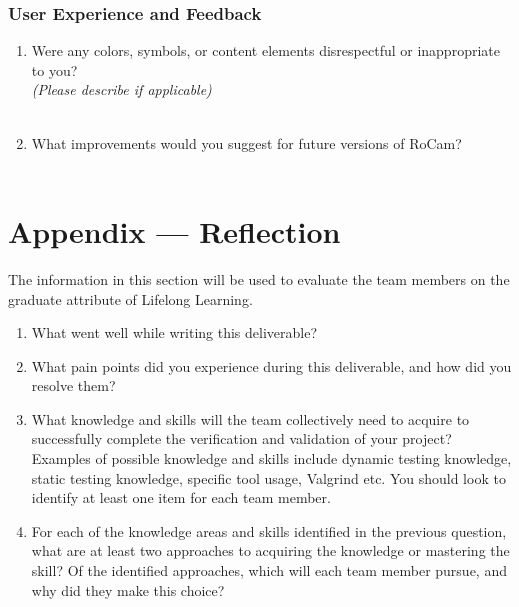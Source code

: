 \documentclass[12pt, titlepage]{article}
\begin{document}
\subsubsection*{User Experience and Feedback}

\begin{enumerate}
  \item Were any colors, symbols, or content elements disrespectful or inappropriate to
        you?\\ \textit{(Please describe if applicable)}\\[1em]
        \makebox[0.95\textwidth]{\hrulefill}\\[0.5em]
        \makebox[0.95\textwidth]{\hrulefill}
  \item What improvements would you suggest for future versions of RoCam?\\[1em]
        \makebox[0.95\textwidth]{\hrulefill}\\[0.5em]
        \makebox[0.95\textwidth]{\hrulefill}
\end{enumerate}

\newpage{}
\section*{Appendix --- Reflection}


The information in this section will be used to evaluate the team members on
the graduate attribute of Lifelong Learning.



\begin{enumerate}
  \item What went well while writing this deliverable?
  \item What pain points did you experience during this deliverable, and how did you
        resolve them?
  \item What knowledge and skills will the team collectively need to acquire to
        successfully complete the verification and validation of your project? Examples
        of possible knowledge and skills include dynamic testing knowledge, static
        testing knowledge, specific tool usage, Valgrind etc. You should look to
        identify at least one item for each team member.
  \item For each of the knowledge areas and skills identified in the previous question,
        what are at least two approaches to acquiring the knowledge or mastering the
        skill? Of the identified approaches, which will each team member pursue, and
        why did they make this choice?
\end{enumerate}
\end{document}
